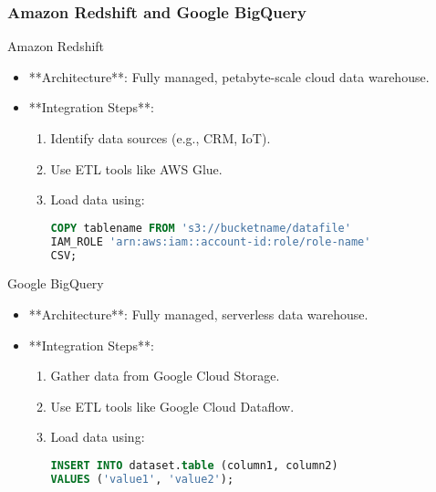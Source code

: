 \documentclass[aspectratio=169]{beamer}
\begin{document}
\begin{frame}[fragile]
    \frametitle{Amazon Redshift and Google BigQuery}
    \begin{block}{Amazon Redshift}
        \begin{itemize}
            \item **Architecture**: Fully managed, petabyte-scale cloud data warehouse.
            \item **Integration Steps**:
                \begin{enumerate}
                    \item Identify data sources (e.g., CRM, IoT).
                    \item Use ETL tools like AWS Glue.
                    \item Load data using:
                    \begin{lstlisting}[language=SQL]
COPY tablename FROM 's3://bucketname/datafile'
IAM_ROLE 'arn:aws:iam::account-id:role/role-name'
CSV;
                    \end{lstlisting}
                \end{enumerate}
        \end{itemize}
    \end{block}
    
    \begin{block}{Google BigQuery}
        \begin{itemize}
            \item **Architecture**: Fully managed, serverless data warehouse.
            \item **Integration Steps**:
                \begin{enumerate}
                    \item Gather data from Google Cloud Storage.
                    \item Use ETL tools like Google Cloud Dataflow.
                    \item Load data using:
                    \begin{lstlisting}[language=SQL]
INSERT INTO dataset.table (column1, column2)
VALUES ('value1', 'value2');
                    \end{lstlisting}
                \end{enumerate}
        \end{itemize}
    \end{block}
\end{frame}
\end{document}
